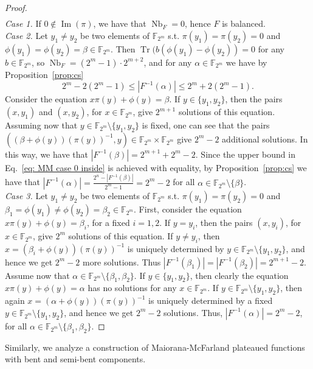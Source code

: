 \documentclass[11pt]{article}
\newcommand{\F}{\mathbb F}
\DeclareMathOperator{\Nb}{Nb}
\DeclareMathOperator{\Tr}{Tr}
\theoremstyle{plain}
\theoremstyle{definition}
\numberwithin{theorem}{section}
\numberwithin{equation}{section}
\numberwithin{table}{section}
\numberwithin{figure}{section}
\DeclareMathOperator{\image}{Im}
\begin{document}
{\begin{proof}
\begin{equation*}
\begin{split}
    \end{split}
    \end{equation*}
\textit{Case 1.} If $0\notin\image(\pi)$, we have that $\Nb_F=0$, hence $F$ is balanced.\ \\
\textit{Case 2.} Let $y_1\neq y_2$ be two elements of $\F_{2^m}$ s.t. $\pi(y_1)=\pi(y_2)=0$ and $\phi(y_1)=\phi(y_2)=\beta\in\F_{2^m}$.  Then $\Tr(b(\phi(y_1)-\phi(y_2))=0$ for any $b \in \F_{2^m}$, so $\Nb_F=(2^m-1)\cdot2^{m+2}$, and for any $\alpha\in\F_{2^m}$ we have by Proposition~\ref{prop:cs} 
\begin{equation}\label{eq: MM case 0 inside}
    2^m-2(2^m-1) \leq |F^{-1}(\alpha)| \leq 2^m+2(2^m-1).
\end{equation}
Consider the equation $x\pi(y)+\phi(y)=\beta$. If $y\in\{y_1,y_2 \}$, then the pairs $(x,y_1)$ and $(x,y_2)$, for $x\in\F_{2^m}$, give $2^{m+1}$ solutions of this equation. Assuming now that  $y\in\F_{2^m}\setminus\{y_1,y_2\}$ is fixed, one can see that the pairs $\left((\beta+\phi(y))(\pi(y))^{-1},y\right)\in\F_{2^m}\times\F_{2^m}$ give $2^m-2$ additional solutions. In this way, we have that $|F^{-1}(\beta)| = 2^{m+1}+2^m-2$. Since the upper bound in Eq.~\eqref{eq: MM case 0 inside} is achieved with equality, by Proposition~\ref{prop:cs} we have that $|F^{-1}(\alpha)|=\frac{2^n-|F^{-1}(\beta)|}{2^m-1}=2^m-2$ for all $\alpha \in \F_{2^m}\setminus\{ \beta \}$. \ \\ 
\noindent\textit{Case 3.} Let $y_1\neq y_2$ be two elements of $\F_{2^m}$ s.t. $\pi(y_1)=\pi(y_2)=0$ and $\beta_1=\phi(y_1)\neq\phi(y_2)=\beta_2\in\F_{2^m}$. First, consider the equation $x\pi(y)+\phi(y)=\beta_i$, for a fixed $i=1,2$. If $y=y_i$, then the pairs $(x,y_i)$, for $x\in\F_{2^m}$, give $2^{m}$ solutions of this equation. If $y\neq 
 y_i$, then $x=(\beta_i+\phi(y))(\pi(y))^{-1}$ is uniquely determined by $y\in\F_{2^m}\setminus\{y_1,y_2\}$, and hence we get $2^m-2$ more solutions. Thus $|F^{-1}(\beta_1)|=|F^{-1}(\beta_2)|=2^{m+1}-2$. Assume now that $\alpha\in\F_{2^m}\setminus\{\beta_1,\beta_2\}$. If $y\in\{y_1,y_2\}$, then clearly the equation $x\pi(y)+\phi(y)=\alpha$ has no solutions for any $x\in\F_{2^m}$. If $y\in\F_{2^m}\setminus\{y_1,y_2\}$, then again $x=(\alpha+\phi(y))(\pi(y))^{-1}$ is uniquely determined by a fixed $y\in\F_{2^m}\setminus\{y_1,y_2\}$, and hence we get $2^m-2$ solutions. Thus, $|F^{-1}(\alpha)| = 2^m-2$, for all $\alpha\in\F_{2^m}\setminus\{\beta_1,\beta_2\}$.
\end{proof}
Similarly, we analyze a construction of Maiorana-McFarland plateaued functions~\cite{carlet2015boolean} with bent and semi-bent components.
}
\end{document}
